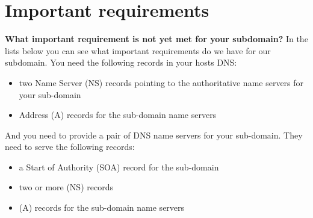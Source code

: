 \documentclass[a4paper]{article}
\newcommand\tab[1][1cm]{\hspace*{#1}}
\begin{document}
\section{Important requirements}
\tab \textbf{What important requirement is not yet met for your subdomain?} \newline \newline
In the lists below you can see what important requirements do we have for our subdomain. You need the following records in your hosts DNS:
\begin{itemize}
	\item two Name Server (NS) records pointing to the authoritative name servers for your sub-domain
	\item Address (A) records for the sub-domain name servers
\end{itemize} 
\tab And you need to provide a pair of DNS name servers for your sub-domain. They need to serve the following records:
\begin{itemize}
	\item a Start of Authority (SOA) record for the sub-domain
	\item two or more (NS) records
	\item (A) records for the sub-domain name servers
\end{itemize} 
\end{document}
